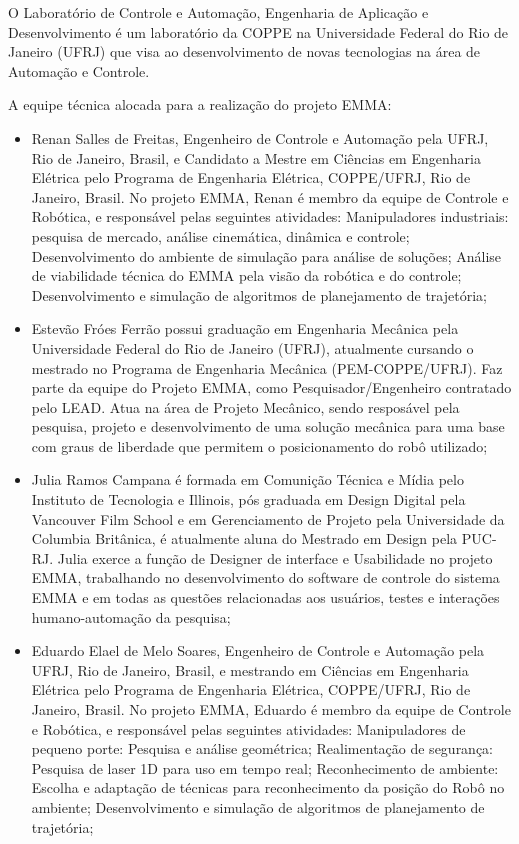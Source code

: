 O Laboratório de Controle e Automação, Engenharia
de Aplicação e Desenvolvimento é um laboratório da COPPE na Universidade
Federal do Rio de Janeiro (UFRJ) que visa ao desenvolvimento de novas
tecnologias na área de Automação e Controle.


A equipe técnica alocada para a realização do projeto EMMA:

\begin{itemize}
  \item Renan Salles de Freitas, Engenheiro de Controle e
Automação pela UFRJ, Rio de Janeiro, Brasil, e Candidato a Mestre em Ciências em Engenharia Elétrica
pelo Programa de Engenharia Elétrica, COPPE/UFRJ, Rio de Janeiro, Brasil. No
projeto EMMA, Renan é membro da equipe de Controle e Robótica, e responsável
pelas seguintes atividades: Manipuladores industriais: pesquisa de
mercado, análise cinemática, dinâmica e controle; Desenvolvimento do ambiente de
simulação para análise de soluções; Análise de viabilidade técnica do EMMA pela
visão da robótica e do controle; Desenvolvimento e simulação de algoritmos de
planejamento de trajetória;

  \item Estevão Fróes Ferrão possui graduação em Engenharia Mecânica pela Universidade
Federal do Rio de Janeiro (UFRJ), atualmente cursando o mestrado no Programa de Engenharia
Mecânica (PEM-COPPE/UFRJ). Faz parte da equipe do Projeto EMMA, como
Pesquisador/Engenheiro contratado pelo LEAD. Atua na área de Projeto Mecânico,
sendo resposável pela pesquisa, projeto e desenvolvimento de uma solução
mecânica para uma base com graus de liberdade que permitem o posicionamento do
robô utilizado;

\item Julia Ramos Campana é formada em Comunição Técnica e Mídia pelo Instituto de
Tecnologia e Illinois, pós graduada em Design Digital pela Vancouver Film School
e em Gerenciamento de Projeto pela Universidade da Columbia Britânica, é
atualmente aluna do Mestrado em Design pela PUC-RJ. Julia exerce a função de
Designer de interface e Usabilidade no projeto EMMA, trabalhando no
desenvolvimento do software de controle do sistema EMMA e em todas as questões
relacionadas aos usuários, testes e interações humano-automação da pesquisa;

\item Eduardo Elael de Melo Soares, Engenheiro de Controle e Automação pela UFRJ, Rio
de Janeiro, Brasil, e mestrando em Ciências em Engenharia Elétrica pelo
Programa de Engenharia Elétrica, COPPE/UFRJ, Rio de Janeiro, Brasil. No projeto
EMMA, Eduardo é membro da equipe de Controle e Robótica, e responsável pelas
seguintes atividades: Manipuladores de pequeno porte: Pesquisa e análise
geométrica; Reali\-mentação de segurança: Pesquisa de laser 1D para uso em tempo
real; Reconhecimento de ambiente: Escolha e adaptação de técnicas para
reconhecimento da posição do Robô no ambiente; Desenvolvimento e simulação de
algoritmos de planejamento de trajetória;


\end{itemize}
